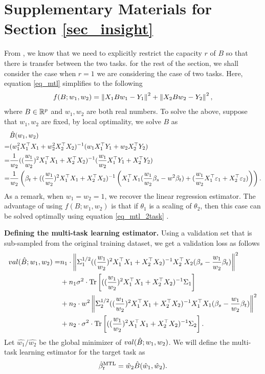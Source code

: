 \section{Supplementary Materials for Section \ref{sec_insight}}

From \cite{WZR20}, we know that we need to explicitly restrict the capacity $r$ of $B$ so that there is transfer between the two tasks.
for the rest of the section, we shall consider the case when $r=1$ we are considering the case of two tasks.
Here, equation \eqref{eq_mtl} simplifies to the following
\begin{align}\label{eq_mtl_2task}
	f(B; w_1, w_2) = \left\| X_1 B w_1 - Y_1 \right\|^2 + \left\| X_2 B w_2 - Y_2 \right\|^2,
\end{align}
where $B\in\mathbb{R}^p$ and $w_1, w_2$ are both real numbers.
To solve the above, suppose that $w_1, w_2$ are fixed, by local optimality, we solve $B$ as
\begin{align*}
	& \hat{B}(w_1, w_2) \\
	=& (w_1^2 X_1^{\top}X_1 + w_2^2 X_2^{\top}X_2)^{-1} (w_1 X_1^{\top}Y_1 + w_2 X_2^{\top}Y_2) \\
	=& \frac{1}{w_2} ((\frac{w_1}{w_2})^2 X_1^{\top}X_1 + X_2^{\top}X_2)^{-1} (\frac{w_1}{w_2} X_1^{\top}Y_1 + X_2^{\top}Y_2) \\
	=& \frac{1}{w_2}\left({\beta_t + ((\frac{w_1}{w_2})^2 X_1^{\top}X_1 + X_2^{\top}X_2)^{-1}\left({X_1^{\top}X_1(\frac{w_1}{w_2}\beta_s - w^2\beta_t) + (\frac{w_1}{w_2} X_1^{\top}\varepsilon_1 + X_2^{\top}\varepsilon_2)}\right)}\right).
\end{align*}
As a remark, when $w_1 = w_2 = 1$, we recover the linear regression estimator.
The advantage of using $f(B; w_1, w_2)$ is that if $\theta_1$ is a scaling of $\theta_2$, then this case can be solved optimally using equation \eqref{eq_mtl_2task} \cite{KD12}.

\textbf{Defining the multi-task learning estimator.}
Using a validation set that is sub-sampled from the original training dataset, we get a validation loss as follows
\begin{align}
		val(\hat{B}; w_1, w_2)
	= & n_1 \cdot \left\| \Sigma_1^{1/2}((\frac{w_1}{w_2})^2 X_1^{\top}X_1 + X_2^{\top}X_2)^{-1}X_2^{\top}X_2(\beta_s - \frac{w_1}{w_2}\beta_t) \right\|^2 \nonumber \\
		&+ n_1 \sigma^2 \cdot \operatorname{Tr}\left[((\frac{w_1}{w_2})^2 X_1^{\top}X_1 + X_2^{\top}X_2)^{-1}\Sigma_1\right] \nonumber \\
		&+ n_2 \cdot w^2\left\| \Sigma_2^{1/2}((\frac{w_1}{w_2})^2 X_1^{\top}X_1 + X_2^{\top}X_2)^{-1}X_1^{\top}X_1(\beta_s - \frac{w_1}{w_2}\beta_t) \right\|^2 \nonumber \\
		&+ n_2 \cdot \sigma^2 \cdot \operatorname{Tr}\left[((\frac{w_1}{w_2})^2 X_1^{\top}X_1 + X_2^{\top}X_2)^{-1}\Sigma_2\right]. \label{eq_val_mtl}
\end{align}
Let $\hat{w_1}/\hat{w_2}$ be the global minimizer of $val(\hat{B}; w_1, w_2)$.
We will define the multi-task learning estimator for the target task as
	\[ \hat{\beta}_t^{\text{MTL}} = \hat{w}_{2}\hat{B}(\hat{w}_1, \hat{w}_2). \]

